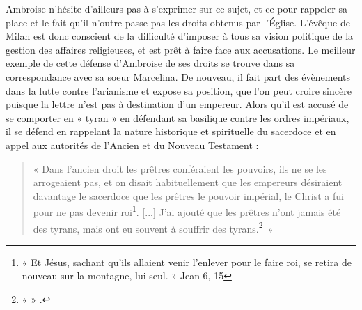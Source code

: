 Ambroise n'hésite d'ailleurs pas à s'exprimer sur ce sujet, et ce pour rappeler sa place et le fait qu'il n'outre-passe pas les droits obtenus par l'Église. L'évêque de Milan est donc conscient de la difficulté d'imposer à tous sa vision politique de la gestion des affaires religieuses, et est prêt à faire face aux accusations. Le meilleur exemple de cette défense d'Ambroise de ses droits se trouve dans sa correspondance avec sa soeur Marcelina. De nouveau, il fait part des évènements dans la lutte contre l'arianisme et expose sa position, que l'on peut croire sincère puisque la lettre n'est pas à destination d'un empereur. Alors qu'il est accusé de se comporter en « tyran » en défendant sa basilique contre les ordres impériaux, il se défend en rappelant la nature historique et spirituelle du sacerdoce et en appel aux autorités de l'Ancien et du Nouveau Testament :

\bigskip

\begin{quote}
    « Dans l’ancien droit les prêtres conféraient les pouvoirs, ils ne se les arrogeaient pas, et on disait habituellement que les empereurs désiraient davantage le sacerdoce que les prêtres le pouvoir impérial, le Christ a fui pour ne pas devenir roi\footnote{« Et Jésus, sachant qu'ils allaient venir l'enlever pour le faire roi, se retira de nouveau sur la montagne, lui seul. » Jean 6, 15}. [...] J’ai ajouté que les prêtres n’ont jamais été des tyrans, mais ont eu souvent à souffrir des tyrans.\footnote{«  » \cite[,23]{ambroise_lettres}.}~»
\end{quote}

\bigskip

